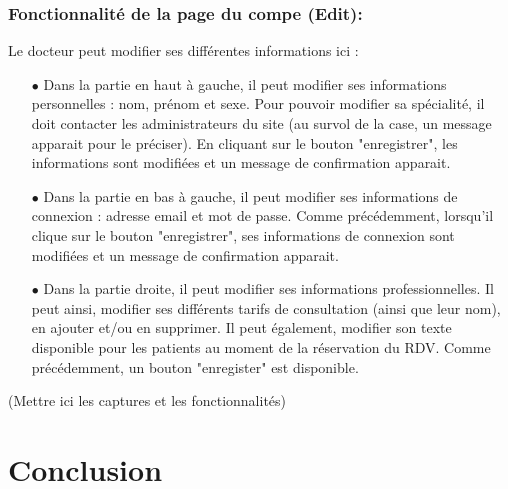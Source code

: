 \documentclass[a4paper]{report}
\begin{document}
\subsection{{Fonctionnalité de la page du compe (Edit)}:}\label{edit2}
Le docteur peut modifier ses différentes informations ici :
\begin{itemize}
    \item[$\bullet$] Dans la partie en haut à gauche, il peut modifier ses informations personnelles : nom, prénom et sexe. Pour pouvoir modifier sa spécialité,
    il doit contacter les administrateurs du site (au survol de la case, un message apparait pour le préciser). En cliquant sur le bouton "enregistrer", les informations sont 
    modifiées et un message de confirmation apparait.
    \item[$\bullet$] Dans la partie en bas à gauche, il peut modifier ses informations de connexion : adresse email et mot de passe. Comme précédemment, lorsqu'il clique sur le bouton "enregistrer", ses
    informations de connexion sont modifiées et un message de confirmation apparait.
    \item[$\bullet$] Dans la partie droite, il peut modifier ses informations professionnelles. Il peut ainsi, modifier ses différents tarifs de consultation (ainsi que leur nom), en ajouter et/ou 
    en supprimer. Il peut également, modifier son texte disponible pour les patients au moment de la réservation du RDV. Comme précédemment, un bouton "enregister" est disponible.
\end{itemize}
\vspace{1cm}

(Mettre ici les captures et les fonctionnalités)

\chapter{Conclusion}
\end{document}
